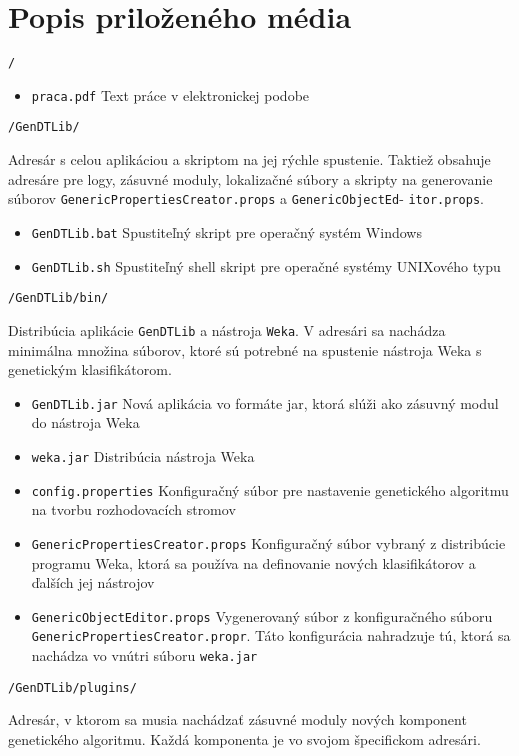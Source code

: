 \chapter{Popis priloženého média}\label{kapI}
{\LARGE\verb|/|}

\begin{itemize}
\item \verb|praca.pdf| Text práce v elektronickej podobe
\end{itemize}

{\LARGE\verb|/GenDTLib/|}

Adresár s celou aplikáciou a skriptom na jej rýchle spustenie. Taktiež obsahuje adresáre pre logy, zásuvné moduly, lokalizačné súbory a skripty na generovanie súborov \verb|GenericPropertiesCreator.props| a \verb|GenericObjectEd|- \verb|itor.props|.
\begin{itemize}
\item \verb|GenDTLib.bat| Spustiteľný skript pre operačný systém Windows
\item \verb|GenDTLib.sh| Spustiteľný shell skript pre operačné systémy UNIXového typu
\end{itemize}

{\LARGE\verb|/GenDTLib/bin/|}

Distribúcia aplikácie \verb|GenDTLib| a nástroja \verb|Weka|. V adresári sa nachádza minimálna množina súborov, ktoré sú potrebné na spustenie nástroja Weka s genetickým klasifikátorom.
\begin{itemize}
\item \verb|GenDTLib.jar| Nová aplikácia vo formáte jar, ktorá slúži ako zásuvný modul do nástroja Weka
\item \verb|weka.jar| Distribúcia nástroja Weka
\item \verb|config.properties| Konfiguračný súbor pre nastavenie genetického algoritmu na tvorbu rozhodovacích stromov
\item \verb|GenericPropertiesCreator.props| Konfiguračný súbor vybraný z distribúcie programu Weka, ktorá sa používa na definovanie nových klasifikátorov a ďalších jej nástrojov
\item \verb|GenericObjectEditor.props| Vygenerovaný súbor z konfiguračného súboru \verb|GenericPropertiesCreator.propr|. Táto konfigurácia nahradzuje tú, ktorá sa nachádza vo vnútri súboru \verb|weka.jar|
\end{itemize}

{\LARGE\verb|/GenDTLib/plugins/|}

{
Adresár, v ktorom sa musia nachádzať zásuvné moduly nových komponent genetického algoritmu. Každá komponenta je vo svojom špecifickom adresári.
}

